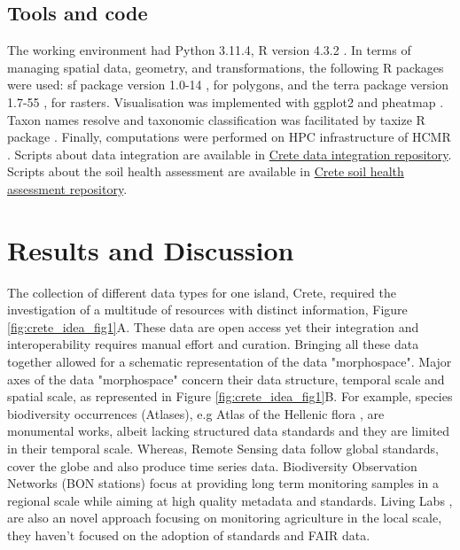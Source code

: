 \documentclass[a4paper,12pt]{article}
\begin{document}
\subsection{Tools and code}\label{Coding environment}
The working environment had Python 3.11.4, R version 4.3.2 \parencite{rcoreteam}.
In terms of managing spatial data, geometry, and transformations, the following
R packages were used:
sf package version 1.0-14 \parencite{Pebesma2023}, for polygons, and the terra
package version 1.7-55 \parencite{hijmans2024terra}, for rasters.
Visualisation was implemented with ggplot2 \parencite{wickham_ggplot2_2016} and pheatmap \parencite{Kolde2019}.
Taxon names resolve and taxonomic classification was facilitated by taxize R package \parencite{chamberlain_taxize_2013}.
Finally, computations were performed on HPC infrastructure of HCMR \parencite{zafeiropoulos_0s_2021}.
Scripts about data integration are available in
\href{https://github.com/savvas-paragkamian/crete-idea.git}{Crete data integration repository}.
Scripts about the soil health assessment are available in 
\href{https://github.com/savvas-paragkamian/crete-soil-health.git}{Crete soil health assessment repository}.

\section{Results and Discussion}\label{crete_idea_results_discussion}

The collection of different data types for one island, Crete, required the investigation
of a multitude of resources with distinct information, Figure \ref{fig:crete_idea_fig1}A.
These data are open access
yet their integration and interoperability requires manual effort and curation. 
Bringing all these data together allowed for a schematic representation of 
the data "morphospace". Major axes of the data "morphospace" concern their
data structure, temporal scale and spatial scale, as represented in Figure \ref{fig:crete_idea_fig1}B. 
For example, species biodiversity occurrences (Atlases), e.g Atlas of the Hellenic flora \parencite{strid2024atlas}, 
are monumental works, albeit lacking structured data standards and they are 
limited in their temporal scale. Whereas, Remote Sensing data follow global 
standards, cover the globe and also produce time series data.
Biodiversity Observation Networks (BON stations) focus at providing long
term monitoring samples in a regional scale while aiming at 
high quality metadata and standards. 
Living Labs \parencite{alhajj-ali2025a-review}, are also an novel approach focusing on 
monitoring agriculture in the local scale, they haven't focused on 
the adoption of standards and FAIR data.
\end{document}
